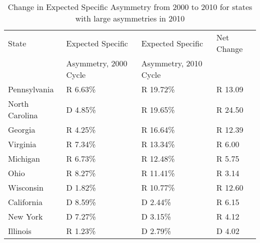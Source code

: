 \begin{table}[htb!]
\centering
\caption{Change in Expected Specific Asymmetry from 2000 to 2010 for states with large asymmetries in 2010 \label{tab:Asym2000to2010}}
\begin{tabular}{|l|l|l|l|}
\hline
State & Expected Specific     & Expected Specific & Net Change\\
      & Asymmetry, 2000 Cycle & Asymmetry, 2010 Cycle & \\
\hline
\hline
Pennsylvania & R 6.63\% & R 19.72\% & R 13.09\\
\hline
North Carolina & D 4.85\% & R 19.65\% & R 24.50\\
\hline
Georgia & R 4.25\% & R 16.64\% & R 12.39\\
\hline
Virginia & R 7.34\% & R 13.34\% & R 6.00\\
\hline
Michigan & R 6.73\% & R 12.48\% & R 5.75\\
\hline
Ohio & R 8.27\% & R 11.41\% & R 3.14\\
\hline
Wisconsin & D 1.82\% & R 10.77\% & R 12.60\\
\hline
California & D 8.59\% & D 2.44\% & R 6.15\\
\hline
New York & D 7.27\% & D 3.15\% & R 4.12\\
\hline
Illinois & R 1.23\% & D 2.79\% & D 4.02\\
\hline
\end{tabular}
\end{table}
